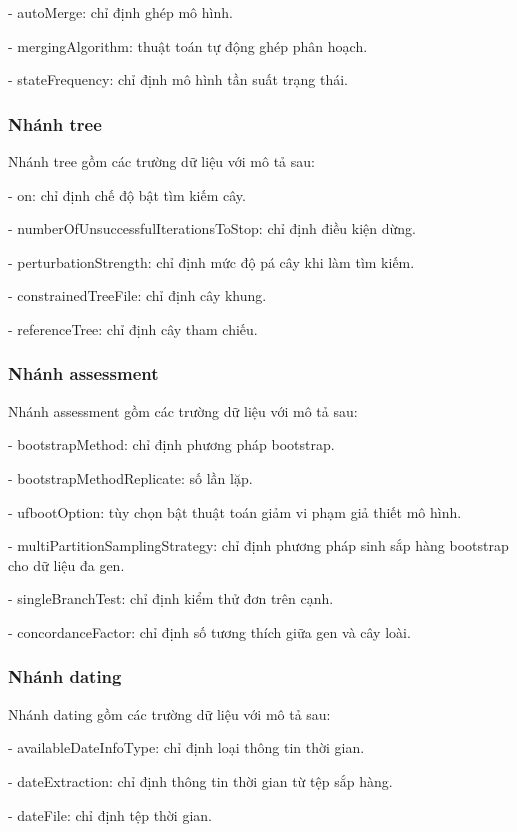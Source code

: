 \documentclass[12pt]{report}
\begin{document}
    - autoMerge: chỉ định ghép mô hình.
    
    - mergingAlgorithm: thuật toán tự động ghép phân hoạch.
    
    - stateFrequency: chỉ định mô hình tần suất trạng thái.
    
\subsubsection{Nhánh tree}
    Nhánh tree gồm các trường dữ liệu với mô tả sau:
    
    - on: chỉ định chế độ bật tìm kiếm cây.
    
    - numberOfUnsuccessfulIterationsToStop: chỉ định điều kiện dừng.
    
    - perturbationStrength: chỉ định mức độ pá cây khi làm tìm kiếm.
    
    - constrainedTreeFile: chỉ định cây khung.
    
    - referenceTree: chỉ định cây tham chiếu.
    
\subsubsection{Nhánh assessment}
    Nhánh assessment gồm các trường dữ liệu với mô tả sau:
    
    - bootstrapMethod: chỉ định phương pháp bootstrap.
    
    - bootstrapMethodReplicate: số lần lặp.
    
    - ufbootOption: tùy chọn bật thuật toán giảm vi phạm giả thiết mô hình.
    
    - multiPartitionSamplingStrategy: chỉ định phương pháp sinh sắp hàng bootstrap cho dữ liệu đa gen.
    
    - singleBranchTest: chỉ định kiểm thử đơn trên cạnh.
    
    - concordanceFactor: chỉ định số tương thích giữa gen và cây loài.

\subsubsection{Nhánh dating}
    Nhánh dating gồm các trường dữ liệu với mô tả sau:
    
    - availableDateInfoType: chỉ định loại thông tin thời gian.
    
    - dateExtraction: chỉ định thông tin thời gian từ tệp sắp hàng.
    
    - dateFile: chỉ định tệp thời gian.
    
\end{document}
